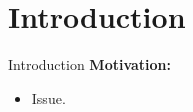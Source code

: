 \section{Introduction}

\begin{frame}{Introduction}
    \textbf{Motivation:}
    \begin{itemize}
      \item Issue. 
    \end{itemize}
\end{frame}

